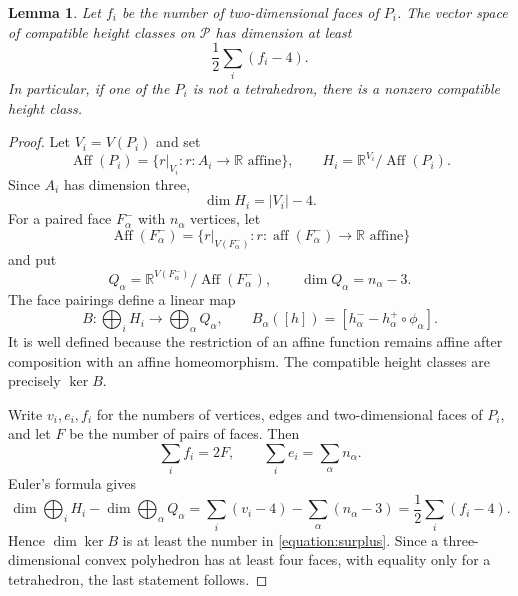 \documentclass[oneside,a4paper,12pt]{article}
\newcommand{\R}{\mathbb R}
\newcommand{\Aff}{\operatorname{Aff}}
\theoremstyle{plain}
\newtheorem{lemma}[theorem]{Lemma}
\theoremstyle{definition}
\theoremstyle{remark}
\numberwithin{equation}{section}
\begin{document}
\begin{lemma}\label{lemma:surplus}
Let $f_i$ be the number of two-dimensional faces of $P_i$. The vector space of compatible height classes on $\mathcal P$ has dimension at least
\begin{equation}\label{equation:surplus}
\frac12\sum_i(f_i-4).
\end{equation}
In particular, if one of the $P_i$ is not a tetrahedron, there is a nonzero compatible height class.
\end{lemma}

\begin{proof}
Let $V_i=V(P_i)$ and set
\begin{equation}
\Aff(P_i)=\{r|_{V_i}:r:A_i\to\R\text{ affine}\},
\qquad
H_i=\R^{V_i}/\Aff(P_i).
  \nonumber \end{equation}
Since $A_i$ has dimension three,
\begin{equation}
\dim H_i=|V_i|-4.
  \nonumber \end{equation}
For a paired face $F^-_\alpha$ with $n_\alpha$ vertices, let
\begin{equation}
\Aff(F^-_\alpha)=\{r|_{V(F^-_\alpha)}:r:\operatorname{aff}(F^-_\alpha)\to\R\text{ affine}\}
  \nonumber \end{equation}
and put
\begin{equation}
Q_\alpha=\R^{V(F^-_\alpha)}/\Aff(F^-_\alpha),
\qquad
\dim Q_\alpha=n_\alpha-3.
  \nonumber \end{equation}
The face pairings define a linear map
\begin{equation}
B:\bigoplus_i H_i\longrightarrow\bigoplus_\alpha Q_\alpha,
\qquad
B_\alpha([h])=[h^-_\alpha-h^+_\alpha\circ\phi_\alpha].
  \nonumber \end{equation}
It is well defined because the restriction of an affine function remains affine after composition with an affine homeomorphism. The compatible height classes are precisely $\ker B$.

Write $v_i,e_i,f_i$ for the numbers of vertices, edges and two-dimensional faces of $P_i$, and let $F$ be the number of pairs of faces. Then
\begin{equation}
\sum_i f_i=2F,
\qquad
\sum_i e_i=\sum_\alpha n_\alpha.
  \nonumber \end{equation}
Euler's formula gives
\begin{equation}
\dim\bigoplus_iH_i-\dim\bigoplus_\alpha Q_\alpha
 =\sum_i(v_i-4)-\sum_\alpha(n_\alpha-3)
 =\frac12\sum_i(f_i-4).
  \nonumber \end{equation}
Hence $\dim\ker B$ is at least the number in \eqref{equation:surplus}. Since a three-dimensional convex polyhedron has at least four faces, with equality only for a tetrahedron, the last statement follows.
\end{proof}
\end{document}
